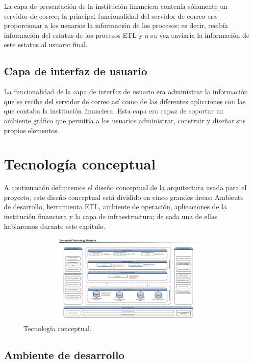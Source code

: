 La capa de presentación de la institución financiera contenía sólamente un
servidor de correo; la principal funcionalidad del servidor de correo era
proporcionar a los usuarios la información de los procesos; es decir, recibía
información del estatus de los procesos ETL y a su vez enviaría la información
de este estatus al usuario final.

\subsection{Capa de interfaz de usuario}

La funcionalidad de la capa de interfaz de usuario era administrar la
información que se recibe del servidor de correo así como de las diferentes
aplicciones con las que contaba la institución financiera. Esta capa era capaz
de soportar un ambiente gráfico que permitía a los usuarios administrar,
construir y diseñar sus propios elementos.

\section{Tecnología conceptual}

A continuación definiremos el diseño conceptual de la arquitectura usada para el
proyecto, este diseño conceptual está dividido en cinco grandes áreas: Ambiente
de desarrollo, herramienta ETL, ambiente de operación, aplicaciones de la
institución financiera y la capa de infraestructura; de cada una de ellas
hablaremos durante este capitulo.

\begin{figure}[htb]
  \begin{center}
    \includegraphics[width=12cm, height=4.5cm, scale=0.5]{Tecnologia_Conceptual.jpg}
        \caption{Tecnología conceptual.}
    \label{fig:conceptual}
  \end{center}
\end{figure}

\subsection{Ambiente de desarrollo}

